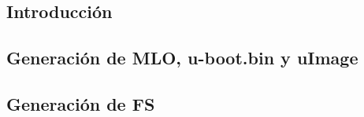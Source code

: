 \subsection{Introducción}
%
%
%


\subsection{Generación de MLO, u-boot.bin y uImage}
%


\subsection{Generación de FS}


